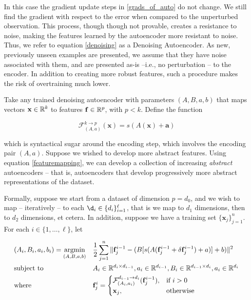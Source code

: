 In this case the gradient update steps in \ref{grads_of_auto} do not change. We still find the gradient with respect to the error when compared to the unperturbed observation. This process, though though not provable, creates a resistance to noise, making the features learned by the autoencoder more resistant to noise. Thus, we refer to equation \eqref{denoising} as a Denoising Autoencoder. As new, previously unseen examples are presented, we assume that they have noise associated with them, and are presented as-is --i.e., no perturbation -- to the encoder. In addition to creating more robust features, such a procedure makes the risk of overtraining much lower.

Take any trained denoising autoencoder with parameters $(A,B,a,b)$ that maps vectors $\mathbf{x}\in\mathbb{R}^k$ to features $\mathbf{f}\in\mathbb{R}^{p}$, with $p<k$. Define the function

\begin{equation}
\label{featuremapping}
\mathcal{F}_{(A,a)}^{k\rightarrow p}(\mathbf{x}) = s(A(\mathbf{x}) + \mathbf{a})
\end{equation}

which is syntactical sugar around the encoding step, which involves the encoding pair $(A,a)$. Suppose we wished to develop more abstract features. Using equation \eqref{featuremapping}, we can develop a collection of increasing \emph{abstract} autoencoders -- that is, autoencoders that develop progressively more abstract representations of the dataset. 

Formally, suppose we start from a dataset of dimension $p = d_0$, and we wish to map -- iteratively --  to each $\d_i\in\{d_i\}_{i=1}^{\ell}$, that is we map to $d_1$ dimensions, then to $d_2$ dimensions, et cetera. In addition, suppose we have a training set $\{\mathbf{x}_j\}_{j=1}^n$. For each $i\in\{1,\ldots,\ell\}$, let


\begin{equation}
\begin{aligned}
\label{auto_soln}
& (A_i,B_i,a_i,b_i) = \underset{(A,B,a,b)}{\text{argmin}}
& & \frac{1}{2}\sum_{j = 1}^{n} \Vert \mathbf{f}_j^{i-1} -  (B[s(A(\mathbf{f}_j^{i-1}+\delta\mathbf{f}_j^{i-1}) + a)]+b) \Vert ^ 2 \\
& \text{subject to}
& & A_i\in\mathbb{R}^{d_i\times d_{i-1}}, a_i\in\mathbb{R}^{d_{i-1}}, B_i\in\mathbb{R}^{d_{i-1}\times d_{i}}, a_i\in\mathbb{R}^{d_{i}} \\
& \text{where}
& & \mathbf{f}^{i}_j = 
	\begin{cases} 
		\mathcal{F}_{(A_{i},a_{i})}^{d_{i-1}\rightarrow d_i}(\mathbf{f}_j^{i-1}), & \mbox{if } i>0\\ 
		\mathbf{x}_j, & \mbox{otherwise}
	\end{cases}
\end{aligned}
\end{equation}


